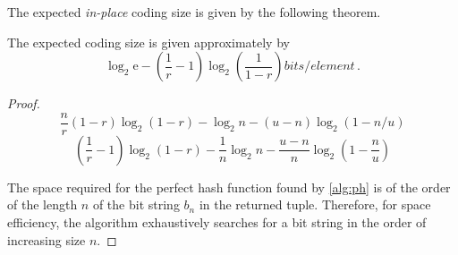 \documentclass[ ../main.tex]{subfiles}
\begin{document}
The expected \emph{in-place} coding size is given by the following theorem.
\begin{theorem}
The expected coding size is given approximately by
\begin{equation}
\label{eq:code_size}
    \log_2 \mathrm{e} - \left(\frac{1}{r} - 1\right) \log_2\!\left(\frac{1}{1-r}\right) \si{bits \per element}\,.
\end{equation}
\end{theorem}
\begin{proof}
\begin{equation}
    \frac{n}{r}(1 - r) \log_2 \left(1 - r\right) - \log_2 n - (u - n) \log_2 (1 - n/u)
\end{equation}
\begin{equation}
    \left(\frac{1}{r} - 1\right) \log_2 \left(1 - r\right) - \frac{1}{n}\log_2 n - \frac{u - n}{n} \log_2\left(1 - \frac{n}{u}\right)
\end{equation}

The space required for the perfect hash function found by \cref{alg:ph} is of the order of the length $n$ of the bit string $b_n$ in the returned tuple. Therefore, for space efficiency, the algorithm exhaustively searches for a bit string in the order of increasing size $n$.


\end{proof}
\end{document}
